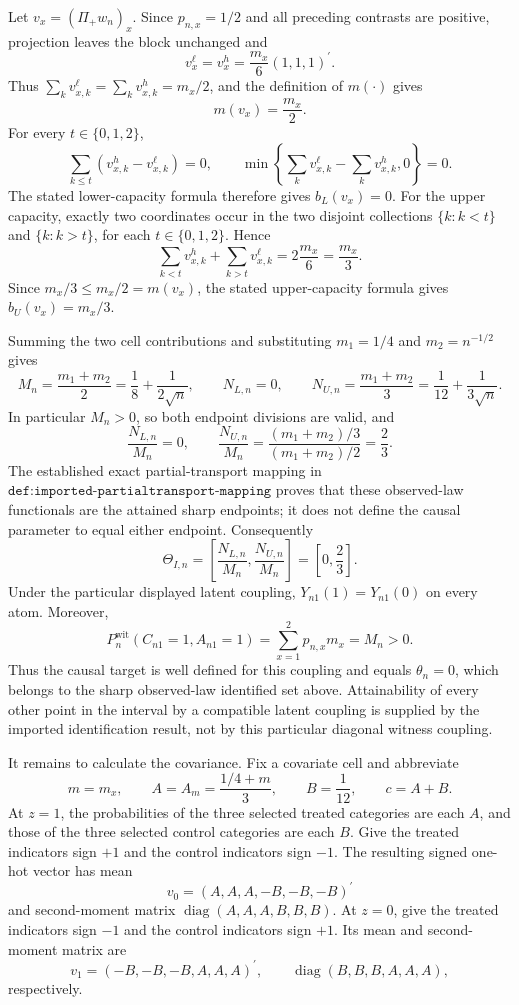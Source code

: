 Let \(v_x=(\Pi_+w_n)_x\). Since \(p_{n,x}=1/2\) and all preceding contrasts are positive, projection leaves the block unchanged and
\[
v_x^\ell=v_x^h=\frac{m_x}{6}(1,1,1)^{\prime}.
\]
Thus \(\sum_kv_{x,k}^\ell=\sum_kv_{x,k}^h=m_x/2\), and the definition of \(m(\cdot)\) gives
\[
m(v_x)=\frac{m_x}{2}.
\]
For every \(t\in\{0,1,2\}\),
\[
\sum_{k\leq t}(v_{x,k}^h-v_{x,k}^\ell)=0,
\qquad
\min\!\left\{\sum_kv_{x,k}^\ell-\sum_kv_{x,k}^h,0\right\}=0.
\]
The stated lower-capacity formula therefore gives \(b_L(v_x)=0\). For the upper capacity, exactly two coordinates occur in the two disjoint collections \(\{k:k<t\}\) and \(\{k:k>t\}\), for each \(t\in\{0,1,2\}\). Hence
\[
\sum_{k<t}v_{x,k}^h+\sum_{k>t}v_{x,k}^\ell
=2\frac{m_x}{6}=\frac{m_x}{3}.
\]
Since \(m_x/3\leq m_x/2=m(v_x)\), the stated upper-capacity formula gives \(b_U(v_x)=m_x/3\).

Summing the two cell contributions and substituting \(m_1=1/4\) and \(m_2=n^{-1/2}\) gives
\[
M_n=\frac{m_1+m_2}{2}=\frac18+\frac1{2\sqrt n},
\qquad
N_{L,n}=0,
\qquad
N_{U,n}=\frac{m_1+m_2}{3}=\frac1{12}+\frac1{3\sqrt n}.
\]
In particular \(M_n>0\), so both endpoint divisions are valid, and
\[
\frac{N_{L,n}}{M_n}=0,
\qquad
\frac{N_{U,n}}{M_n}
=\frac{(m_1+m_2)/3}{(m_1+m_2)/2}=\frac23.
\]
The established exact partial-transport mapping in \(\texttt{def:imported-partialtransport-mapping}\) proves that these observed-law functionals are the attained sharp endpoints; it does not define the causal parameter to equal either endpoint. Consequently
\[
\Theta_{I,n}=\left[\frac{N_{L,n}}{M_n},\frac{N_{U,n}}{M_n}\right]
=\left[0,\frac23\right].
\]
Under the particular displayed latent coupling, \(Y_{n1}(1)=Y_{n1}(0)\) on every atom. Moreover,
\[
P_n^{\mathrm{wit}}(C_{n1}=1,A_{n1}=1)
=\sum_{x=1}^2p_{n,x}m_x=M_n>0.
\]
Thus the causal target is well defined for this coupling and equals \(\theta_n=0\), which belongs to the sharp observed-law identified set above. Attainability of every other point in the interval by a compatible latent coupling is supplied by the imported identification result, not by this particular diagonal witness coupling.

It remains to calculate the covariance. Fix a covariate cell and abbreviate
\[
m=m_x,
\qquad
A=A_m=\frac{1/4+m}{3},
\qquad
B=\frac1{12},
\qquad
c=A+B.
\]
At \(z=1\), the probabilities of the three selected treated categories are each \(A\), and those of the three selected control categories are each \(B\). Give the treated indicators sign \(+1\) and the control indicators sign \(-1\). The resulting signed one-hot vector has mean
\[
v_0=(A,A,A,-B,-B,-B)^{\prime}
\]
and second-moment matrix \(\operatorname{diag}(A,A,A,B,B,B)\). At \(z=0\), give the treated indicators sign \(-1\) and the control indicators sign \(+1\). Its mean and second-moment matrix are
\[
v_1=(-B,-B,-B,A,A,A)^{\prime},
\qquad
\operatorname{diag}(B,B,B,A,A,A),
\]
respectively.

